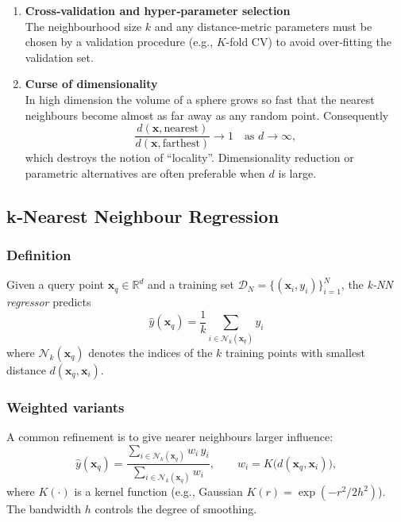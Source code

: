 \documentclass[12pt, a4paper]{article}
\begin{document}
\begin{enumerate}
\item \textbf{Cross‑validation and hyper‑parameter selection}\\
    The neighbourhood size \(k\) and any distance‑metric parameters must be chosen by a validation procedure (e.g., \(K\)-fold CV) to avoid over‑fitting the validation set.

\item \textbf{Curse of dimensionality}\\
    In high dimension the volume of a sphere grows so fast that the nearest neighbours become almost as far away as any random point.  Consequently
    \[
    \frac{d(\mathbf{x},\text{nearest})}{d(\mathbf{x},\text{farthest})} \to 1\quad \text{as } d\to\infty,
    \]
    which destroys the notion of “locality”.  Dimensionality reduction or parametric alternatives are often preferable when \(d\) is large.
\end{enumerate}

\vspace{0.5cm}
\subsection{k‑Nearest Neighbour Regression}
\label{sec:knn-regression}

\subsubsection{Definition}
Given a query point \(\mathbf{x}_{q}\in\mathbb{R}^{d}\) and a training set \(\mathcal{D}_N=\{(\mathbf{x}_i,y_i)\}_{i=1}^{N}\), the \emph{k‑NN regressor} predicts
\[
\boxed{\;
\hat{y}(\mathbf{x}_{q}) = \frac{1}{k}\sum_{i\in\mathcal{N}_{k}(\mathbf{x}_{q})} y_i
\;}
\tag{1}
\]
where \(\mathcal{N}_{k}(\mathbf{x}_{q})\) denotes the indices of the \(k\) training points with smallest distance \(d(\mathbf{x}_{q},\mathbf{x}_i)\).

\subsubsection{Weighted variants}
A common refinement is to give nearer neighbours larger influence:
\[
\hat{y}(\mathbf{x}_{q}) = \frac{\sum_{i\in\mathcal{N}_{k}(\mathbf{x}_{q})} w_i\,y_i}
                               {\sum_{i\in\mathcal{N}_{k}(\mathbf{x}_{q})} w_i},
\qquad 
w_i = K\!\big(d(\mathbf{x}_{q},\mathbf{x}_i)\big),
\]
where \(K(\cdot)\) is a kernel function (e.g., Gaussian \(K(r)=\exp(-r^{2}/2h^{2})\)).  The bandwidth \(h\) controls the degree of smoothing.
\end{document}
